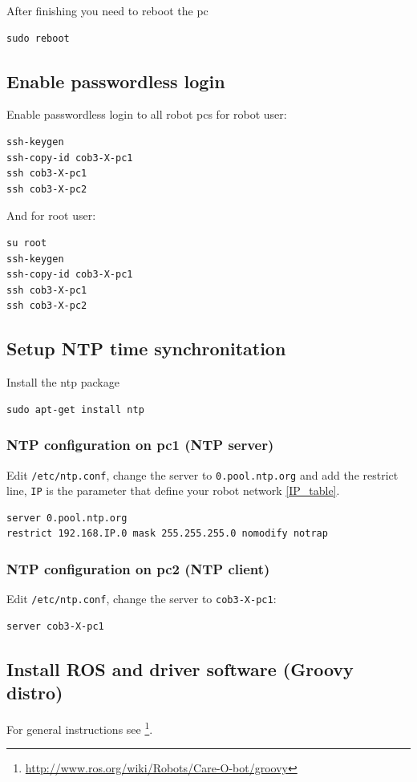 After finishing you need to reboot the pc

\begin{lstlisting} 
sudo reboot
\end{lstlisting}


\subsection{Enable passwordless login}
Enable passwordless login to all robot pcs for robot user:
\begin{lstlisting}
ssh-keygen
ssh-copy-id cob3-X-pc1
ssh cob3-X-pc1
ssh cob3-X-pc2
\end{lstlisting}
And for root user:
\begin{lstlisting}
su root
ssh-keygen
ssh-copy-id cob3-X-pc1
ssh cob3-X-pc1
ssh cob3-X-pc2
\end{lstlisting}

\subsection{Setup NTP time synchronitation}
Install the ntp package

\begin{lstlisting}
sudo apt-get install ntp
\end{lstlisting}

\subsubsection{NTP configuration on pc1 (NTP server)}
Edit \texttt{/etc/ntp.conf}, change the server to \texttt{0.pool.ntp.org} and add the restrict line, \texttt{IP} is the parameter that define your robot network \ref{IP_table}.

\begin{lstlisting} 
server 0.pool.ntp.org
restrict 192.168.IP.0 mask 255.255.255.0 nomodify notrap
\end{lstlisting}

\subsubsection{NTP configuration on pc2 (NTP client)}
Edit \texttt{/etc/ntp.conf}, change the server to \texttt{cob3-X-pc1}:
\begin{lstlisting}
server cob3-X-pc1
\end{lstlisting}

\subsection{Install ROS and driver software (Groovy distro)}
For general instructions see \footnote{\url{http://www.ros.org/wiki/Robots/Care-O-bot/groovy}}.

